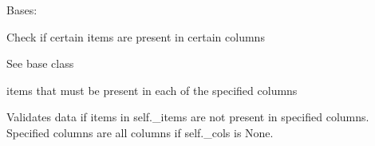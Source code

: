 \documentclass[letterpaper,10pt,english]{sphinxmanual}
\begin{document}
\begin{fulllineitems}
\label{\detokenize{dalio.validator:dalio.validator.pandas_val.HAS_IN_COLS}}
Bases: {\hyperref[\detokenize{dalio.validator:dalio.validator.pandas_val.HAS_COLS}]{}}

Check if certain items are present in certain columns

\begin{fulllineitems}
\label{\detokenize{dalio.validator:dalio.validator.pandas_val.HAS_IN_COLS._cols}}
See base class

\end{fulllineitems}


\begin{fulllineitems}
\label{\detokenize{dalio.validator:dalio.validator.pandas_val.HAS_IN_COLS._items}}
items that must be present in each of the specified columns

\end{fulllineitems}


\begin{fulllineitems}
\label{\detokenize{dalio.validator:dalio.validator.pandas_val.HAS_IN_COLS.validate}}
Validates data if items in self.\_items are not present in specified
columns. Specified columns are all columns if self.\_cols is None.

\end{fulllineitems}


\end{fulllineitems}

\end{document}
